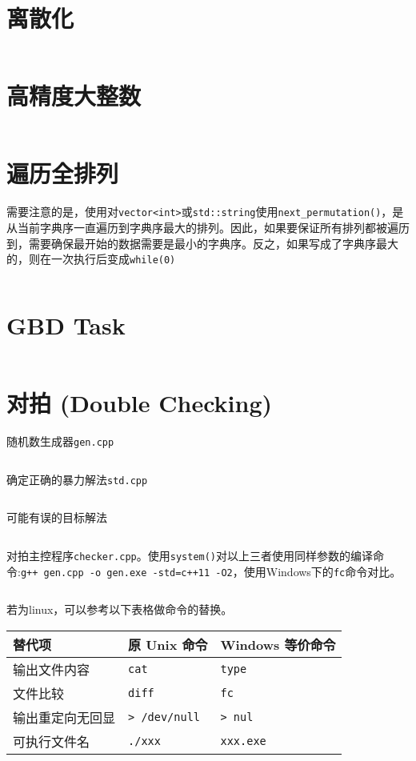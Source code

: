 \documentclass[openany,a4paper]{book}
\begin{document}
\section{离散化}
\inputminted{cpp}{Misc/Discretize.h}

\section{高精度大整数}
\inputminted{cpp}{Misc/BigInt.h}

\section{遍历全排列}
需要注意的是，使用对\verb|vector<int>|或\verb|std::string|使用\verb|next_permutation()|，是从当前字典序一直遍历到字典序最大的排列。因此，如果要保证所有排列都被遍历到，需要确保最开始的数据需要是最小的字典序。反之，如果写成了字典序最大的，则在一次执行后变成\verb|while(0)|
\inputminted{cpp}{Misc/next_permutation.h}

\section{GBD Task}
\inputminted{json}{Misc/GDB-Task.json}

\section{对拍 (Double Checking)}
随机数生成器\verb|gen.cpp|
\inputminted{cpp}{Misc/DoubleChecking/gen.cpp}
确定正确的暴力解法\verb|std.cpp|
\inputminted{cpp}{Misc/DoubleChecking/gen.cpp}
可能有误的目标解法
\inputminted{cpp}{Misc/DoubleChecking/sol.cpp}
对拍主控程序\verb|checker.cpp|。使用\verb|system()|对以上三者使用同样参数的编译命令:\newline\verb|g++ gen.cpp -o gen.exe -std=c++11 -O2|，使用Windows下的\verb|fc|命令对比。
\inputminted{cpp}{Misc/DoubleChecking/checker.cpp}
若为linux，可以参考以下表格做命令的替换。
\begin{tabular}{|l|l|l|}
    \hline
    替代项      & 原 Unix 命令            & Windows 等价命令     \\
    \hline
    输出文件内容   & \texttt{cat}         & \texttt{type}    \\
    文件比较     & \texttt{diff}        & \texttt{fc}      \\
    输出重定向无回显 & \texttt{> /dev/null} & \texttt{> nul}   \\
    可执行文件名   & \texttt{./xxx}       & \texttt{xxx.exe} \\
    \hline
\end{tabular}
\end{document}
